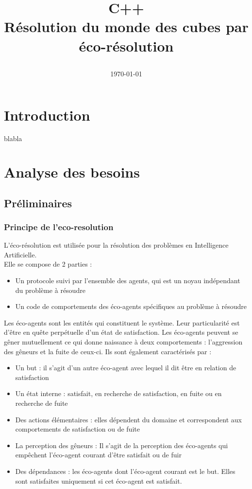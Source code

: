 \documentclass[12pt , a4paper]{article}
\title{C++\\
  \vspace{0.6cm}
  \normalsize{Résolution du monde des cubes par éco-résolution} 
  \begin{center}
  \end{center}
}
\author{\Auteur}
\date{\today}
\begin{document}
\maketitle
\thispagestyle{empty}
\newpage
\thispagestyle{plain}%

\tableofcontents
\newpage
\section{Introduction}
\noindent blabla

\newpage

\section{Analyse des besoins}
\subsection{Préliminaires}
\subsubsection{Principe de l'eco-resolution}
\noindent L'éco-résolution est utilisée pour la résolution des problèmes en Intelligence Artificielle.\\
Elle se compose de 2 parties :
\begin{itemize}
\item Un protocole suivi par l’ensemble des agents, qui est un noyau indépendant du problème à résoudre
\item Un code de comportements des éco-agents spécifiques au problème à résoudre\\
\end{itemize}

\noindent Les éco-agents sont  les entités qui constituent le système.  Leur particularité est d'être en  quête perpétuelle d'un état de satisfaction.  Les éco-agents peuvent se gêner mutuellement ce qui donne
naissance à deux comportements : l'aggression des gêneurs et la fuite de ceux-ci. Ils sont également caractérisés par :
\begin{itemize}
\item Un but : il s'agit d’un autre éco-agent avec lequel il dit être en relation de satisfaction
\item Un état interne : satisfait, en recherche de satisfaction, en fuite ou en recherche de fuite
\item Des actions élémentaires : elles dépendent du domaine et correspondent aux comportements de satisfaction ou de fuite
\item La perception des gêneurs : Il s'agit de la perception des éco-agents qui empêchent l'éco-agent courant d'être satisfait ou de fuir
\item Des dépendances : les éco-agents dont l'éco-agent courant est le but. Elles sont satisfaites uniquement si cet éco-agent est satisfait. \\
\end{itemize}
\end{document}
